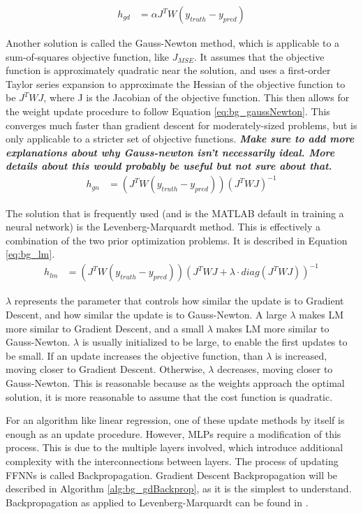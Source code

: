 \documentclass[11pt]{report}
\begin{document}
	\begin{align}
		h_{gd} &= \alpha J^T W(y_{truth}-y_{pred}) \label{eq:bg_gradDescent}
	\end{align}
	\par Another solution is called the Gauss-Newton method, which is applicable to a sum-of-squares objective function, like $J_{MSE}$. It assumes that the objective function is approximately quadratic near the solution, and uses a first-order Taylor series expansion to approximate the Hessian of the objective function to be $J^TWJ$, where J is the Jacobian of the objective function. This then allows for the weight update procedure to follow Equation \ref{eq:bg_gaussNewton}. This converges much faster than gradient descent for moderately-sized problems, but is only applicable to a stricter set of objective functions. \textbf{\textit{Make sure to add more explanations about why Gauss-newton isn't necessarily ideal. More details about this would probably be useful but not sure about that.}}
	\begin{align}
		h_{gn} &= (J^TW(y_{truth}-y_{pred}))(J^T WJ)^{-1} \label{eq:bg_gaussNewton}
	\end{align}
	\par The solution that is frequently used (and is the MATLAB default in training a neural network) is the Levenberg-Marquardt method. This is effectively a combination of the two prior optimization problems. It is described in Equation \ref{eq:bg_lm}. 
	\begin{align}
		h_{lm} &= (J^TW(y_{truth}-y_{pred}))(J^T WJ + \lambda \cdot diag(J^T WJ))^{-1} \label{eq:bg_lm}
	\end{align}
	\par $\lambda$ represents the parameter that controls how similar the update is to Gradient Descent, and how similar the update is to Gauss-Newton. A large $\lambda$ makes LM more similar to Gradient Descent, and a small $\lambda$ makes LM more similar to Gauss-Newton. $\lambda$ is usually initialized to be large, to enable the first updates to be small. If an update increases the objective function, than $\lambda$ is increased, moving closer to Gradient Descent. Otherwise, $\lambda$ decreases, moving closer to Gauss-Newton. This is reasonable because as the weights approach the optimal solution, it is more reasonable to assume that the cost function is quadratic.
	\par For an algorithm like linear regression, one of these update methods by itself is enough as an update procedure. However, MLPs require a modification of this process. This is due to the multiple layers involved, which introduce additional complexity with the interconnections between layers. The process of updating FFNNs is called Backpropagation. Gradient Descent Backpropagation will be described in Algorithm \ref{alg:bg_gdBackprop}, as it is the simplest to understand. Backpropagation as applied to Levenberg-Marquardt can be found in \cite{lm-backprop}.
\end{document}
